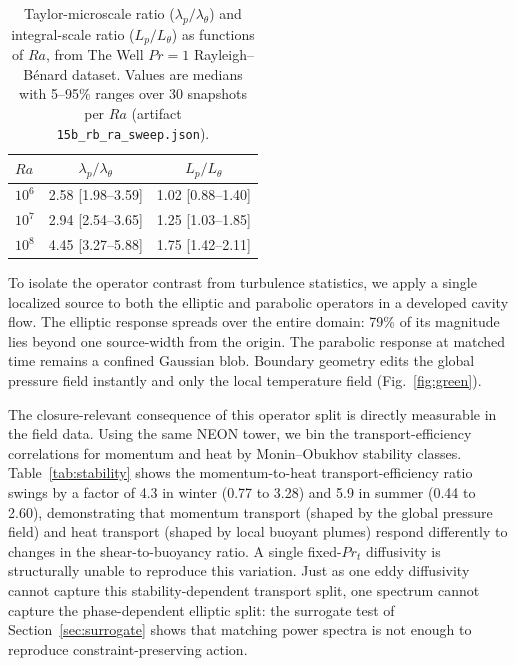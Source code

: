 \documentclass[aps,prfluids,preprint,superscriptaddress,nofootinbib]{revtex4-2}
\newcommand{\code}[1]{\texttt{#1}}
\begin{document}
\begin{table}[t]
\centering
\caption{Taylor-microscale ratio ($\lambda_p/\lambda_\theta$) and integral-scale ratio ($L_p/L_\theta$) as functions of $Ra$, from The Well $Pr=1$ Rayleigh--B\'enard dataset. Values are medians with 5--95\% ranges over 30 snapshots per $Ra$ (artifact \code{15b\_rb\_ra\_sweep.json}).}
\label{tab:ra_sweep}
\begin{tabular}{lcc}
\toprule
$Ra$ & $\lambda_p/\lambda_\theta$ & $L_p/L_\theta$ \\
\midrule
$10^6$ & 2.58 [1.98--3.59] & 1.02 [0.88--1.40] \\
$10^7$ & 2.94 [2.54--3.65] & 1.25 [1.03--1.85] \\
$10^8$ & 4.45 [3.27--5.88] & 1.75 [1.42--2.11] \\
\bottomrule
\end{tabular}
\end{table}

To isolate the operator contrast from turbulence statistics, we apply a single localized source to both the elliptic and parabolic operators in a developed cavity flow. The elliptic response spreads over the entire domain: 79\% of its magnitude lies beyond one source-width from the origin. The parabolic response at matched time remains a confined Gaussian blob. Boundary geometry edits the global pressure field instantly and only the local temperature field (Fig.~\ref{fig:green}).

The closure-relevant consequence of this operator split is directly measurable in the field data. Using the same NEON tower, we bin the transport-efficiency correlations for momentum and heat by Monin--Obukhov stability classes. Table~\ref{tab:stability} shows the momentum-to-heat transport-efficiency ratio swings by a factor of 4.3 in winter (0.77 to 3.28) and 5.9 in summer (0.44 to 2.60), demonstrating that momentum transport (shaped by the global pressure field) and heat transport (shaped by local buoyant plumes) respond differently to changes in the shear-to-buoyancy ratio. A single fixed-$Pr_t$ diffusivity is structurally unable to reproduce this variation. Just as one eddy diffusivity cannot capture this stability-dependent transport split, one spectrum cannot capture the phase-dependent elliptic split: the surrogate test of Section~\ref{sec:surrogate} shows that matching power spectra is not enough to reproduce constraint-preserving action.
\end{document}
